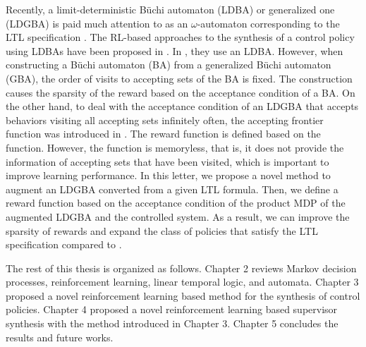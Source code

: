 Recently, a limit-deterministic B\"{u}chi automaton (LDBA) or generalized one (LDGBA) is paid much attention to as an $\omega$-automaton corresponding to the LTL specification \cite{SEJK2016}.
The RL-based approaches to the synthesis of a control policy using LDBAs have been proposed in \cite{HAK2019,Hahn2019,HKAKPL2019,BWZP2019}.
In \cite{Hahn2019,BWZP2019}, they use an LDBA. However, when constructing a B\"{u}chi automaton (BA) from a generalized B\"{u}chi automaton (GBA), the order of visits to accepting sets of the BA is fixed. The construction causes the sparsity of the reward based on the acceptance condition of a BA.
On the other hand, to deal with the acceptance condition of an LDGBA that accepts behaviors visiting all accepting sets infinitely often, the accepting frontier function was introduced in \cite{HAK2019,HKAKPL2019}. The reward function is defined based on the function.
However, the function is memoryless, that is, it does not provide the information of accepting sets that have been visited, which is important to improve learning performance.
In this letter, we propose a novel method to augment an LDGBA converted from a given LTL formula.
Then, we define a reward function based on the acceptance condition of the product MDP of the augmented LDGBA and the controlled system.
As a result, we can improve the sparsity of rewards and expand the class of policies that satisfy the LTL specification compared to \cite{HAK2019}.

The rest of this thesis is organized as follows. Chapter 2 reviews Markov decision processes, reinforcement learning, linear temporal logic, and automata. Chapter 3 proposed a novel reinforcement learning based method for the synthesis of control policies. Chapter 4 proposed a novel reinforcement learning based supervisor synthesis with the method introduced in Chapter 3. Chapter 5 concludes the results and future works.

